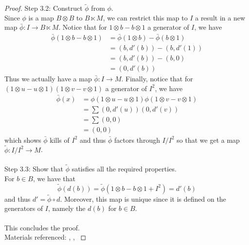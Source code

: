 \documentclass[a4paper]{article}
\begin{document}
\begin{prp}{}{}
\begin{proof}
Step 3.2: Construct $\tilde{\phi}$ from $\phi$. \\
Since $\phi$ is a map $B\otimes B$ to $B\ltimes M$, we can restrict this map to $I$ a result in a new map $\bar{\phi}:I\to B\ltimes M$. Notice that for $1\otimes b-b\otimes 1$ a generator of $I$, we have 
\begin{align*}
\bar{\phi}(1\otimes b-b\otimes 1)&=\bar{\phi}(1\otimes b)-\bar{\phi}(b\otimes 1)\\
&=(b,d'(b))-(b,d'(1))\\
&=(b,d'(b))-(b,0)\\
&=(0,d'(b))
\end{align*}
Thus we actually have a map $\bar{\phi}:I\to M$. Finally, notice that for $(1\otimes u-u\otimes 1)(1\otimes v-v\otimes 1)$ a generator of $I^2$, we have 
\begin{align*}
\bar{\phi}(x)&=\phi(1\otimes u-u\otimes 1)\phi(1\otimes v-v\otimes 1)\\
&=\sum(0,d'(u))(0,d'(v))\\
&=\sum(0,0)\tag{Mult. in Trivial Extension}\\
&=(0,0)
\end{align*}
which shows $\bar{\phi}$ kills of $I^2$ and thus $\bar{\phi}$ factors through $I/I^2$ so that we get a map $\tilde{\phi}:I/I^2\to M$. \\~\\

Step 3.3: Show that $\tilde{\phi}$ satisfies all the required properties. \\
For $b\in B$, we have that $$\tilde{\phi}(d(b))=\tilde{\phi}(1\otimes b-b\otimes 1+I^2)=d'(b)$$ and thus $d'=\tilde{\phi}\circ d$. Moreover, this map is unique since it is defined on the generators of $I$, namely the $d(b)$ for $b\in B$. \\~\\

This concludes the proof. \\
Materials referenced: \cite{Rav}, \cite{Ern}, \cite{Mat}
\end{proof}
\end{prp}
\end{document}
